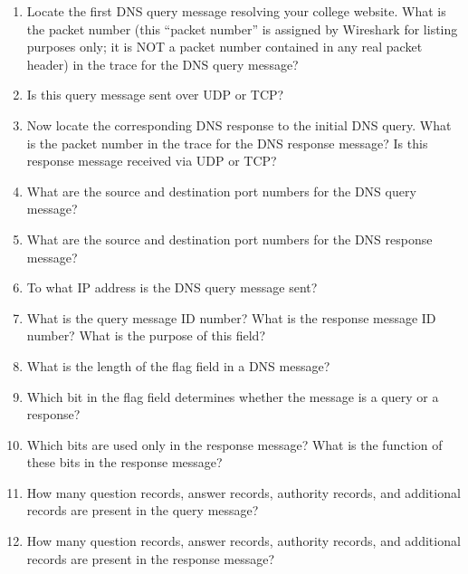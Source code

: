 \documentclass[12pt,a4paper]{article}
\begin{document}
	\begin{enumerate}
		\item[(a)] Locate the first DNS query message resolving your college website. What is the packet number (this ``packet number'' is assigned by Wireshark for listing purposes only; it is NOT a packet number contained in any real packet header) in the trace for the DNS query message?
		\item[(b)] Is this query message sent over UDP or TCP?
		\item[(c)] Now locate the corresponding DNS response to the initial DNS query. What is the packet number in the trace for the DNS response message? Is this response message received via UDP or TCP?
		\item[(d)] What are the source and destination port numbers for the DNS query message?
		\item[(e)] What are the source and destination port numbers for the DNS response message?
		\item[(f)] To what IP address is the DNS query message sent?
		\item[(g)] What is the query message ID number? What is the response message ID number? What is the purpose of this field?
		\item[(h)] What is the length of the flag field in a DNS message?
		\item[(i)] Which bit in the flag field determines whether the message is a query or a response?
		\item[(j)] Which bits are used only in the response message? What is the function of these bits in the response message?
		\item[(k)] How many question records, answer records, authority records, and additional records are present in the query message?
		\item[(l)] How many question records, answer records, authority records, and additional records are present in the response message?
	\end{enumerate}
	
\end{document}
